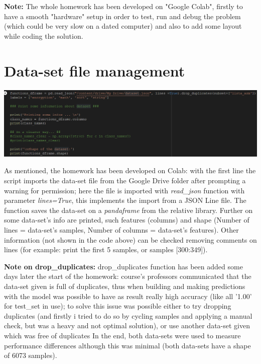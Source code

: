 \documentclass[11pt]{scrartcl}
\begin{document}
\vspace{0.5cm}

\noindent
\textbf{\large{Note:}}\large{ The whole homework has been developed on "Google Colab", firstly to have a smooth "hardware" setup in order to test, run and debug the problem (which could be very slow on a dated computer) and also to add some layout while coding the solution.}

\newpage
\section{Data-set file management}


\vspace{0.4cm}
\hspace{-1.0in}\includegraphics[width=1.3\textwidth]{datasetfile.png}
\vspace{0.3cm}

\noindent
\large{As mentioned, the homework has been developed on Colab: with the first line the script imports the data-set file from the Google Drive folder after prompting a warning for permission; here the file is imported with \textit{read\_json} function with parameter \textit{lines=True}, this implements the import from a JSON Line file. The function saves the data-set on a \textit{pandaframe} from the relative library.\newline
Further on some data-set's info are printed, such features (columns) and shape (Number of lines = data-set's samples, Number of columns = data-set's features). \newline
Other information (not shown in the code above) can be checked removing comments on lines (for example: print the first 5 samples, or samples [300:349]). \newline
}

\vspace{0.5cm}

\noindent
\textbf{\large{Note on drop\_duplicates:}}\large{ \newline
drop\_duplicates function has been added some days later the start of the homework: course's professors communicated that the data-set given is full of duplicates, thus when building and making predictions with the model was possible to have as result really high accuracy (like all '1.00' for test\_set in use); to solve this issue was possible either to try dropping duplicates (and firstly i tried to do so by cycling samples and applying a manual check, but was a heavy  and not optimal solution), or use another data-set given which was free of duplicates \newline
In the end, both data-sets were used to measure performance differences although this was minimal (both data-sets have a shape of 6073 samples).
}
\end{document}
